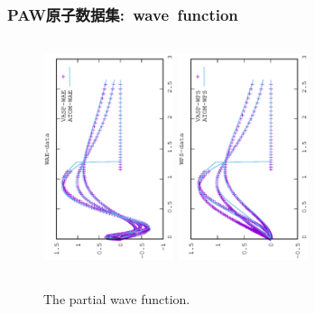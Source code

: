\documentclass[cjk,slidestop,compress,mathserif,blue]{beamer}
\begin{document}
\frame
{
	\frametitle{\textrm{PAW}原子数据集:~\textrm{wave~function}}
\begin{figure}[h!]
\centering
\vskip -0.5in
\includegraphics[width=1.5in,height=2.7in,viewport=0 0 350 550, angle=-90, clip]{Figures/WAE-data.eps}
\vskip -0.2in
\includegraphics[height=2.7in,width=1.5in,viewport=0 0 350 550, angle=-90, clip]{Figures/WPS-data.eps}
\caption{\tiny \textrm{The partial wave function.}}%
\label{Wave_Function}
\end{figure}
}
\end{document}
